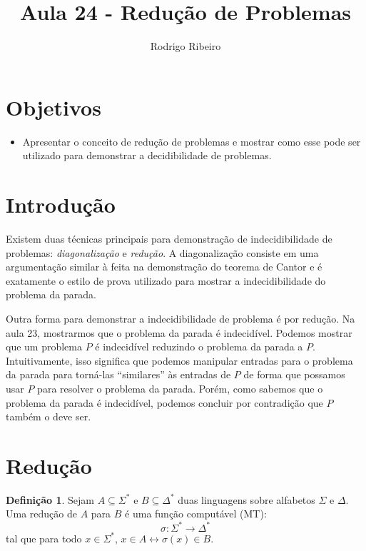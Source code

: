 \documentclass[a4paper]{article}
\theoremstyle{definition}
\newtheorem{Definition}{Definição}
\begin{document}
\title{Aula 24 - Redução de Problemas}
  \author{Rodrigo Ribeiro}

  \maketitle

  \pagestyle{fancy}


  \section*{Objetivos}

  \begin{itemize}
     \item Apresentar o conceito de redução de problemas e mostrar como
           esse pode ser utilizado para demonstrar a decidibilidade de problemas.
  \end{itemize}


  \section{Introdução}

  Existem duas técnicas principais para demonstração de indecidibilidade de
  problemas: \emph{diagonalização} e \emph{redução}. A diagonalização consiste
  em uma argumentação similar à feita  na demonstração do teorema de Cantor e
  é exatamente o estilo de prova utilizado para mostrar a indecidibilidade do
  problema da parada.

  Outra forma para demonstrar a indecidibilidade de problema é por redução.
  Na aula 23, mostrarmos que o problema da parada é indecidível. Podemos mostrar
  que um problema $P$ é indecidível reduzindo o problema da parada a $P$.
  Intuitivamente, isso significa que podemos manipular entradas para o problema
  da parada para torná-las ``similares'' às entradas de $P$ de forma que
  possamos usar $P$ para resolver o problema da parada. Porém, como sabemos que
  o problema da parada é indecidível, podemos concluir por contradição que $P$
  também o deve ser.

  \section{Redução}

  \begin{Definition}
    Sejam $A \subseteq \Sigma^*$ e $B \subseteq \Delta^*$ duas linguagens sobre
    alfabetos $\Sigma$ e $\Delta$. Uma redução de $A$ para $B$ é uma função
    computável (MT):
    \[
      \sigma : \Sigma^*\to \Delta^*
    \]
    tal que para todo $x \in \Sigma^*$, $x \in A \leftrightarrow\sigma(x) \in B $.
  \end{Definition}
\end{document}

